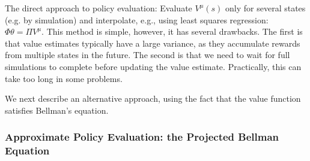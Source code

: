 The direct approach to policy evaluation: Evaluate $V^\mu(s)$ only for several states (e.g. by simulation) and interpolate, e.g., using least squares regression: $\Phi \theta = \Pi V^\mu$. This method is simple, however, it has several drawbacks. The first is that value estimates typically have a large variance, as they accumulate rewards from multiple states in the future. The second is that we need to wait for full simulations to complete before updating the value estimate. Practically, this can take too long in some problems. 

We next describe an alternative approach, using the fact that the value function satisfies Bellman's equation.

\subsubsection{Approximate Policy Evaluation: the Projected Bellman Equation}

